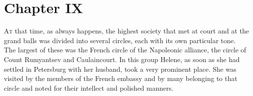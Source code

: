 
\chapter*{Chapter IX}
\ifaudio     
{} 
\fi

\lettrine[lines=2, loversize=0.3, lraise=0]{\initfamily A}{t}
that time, as always happens, the highest society that met at
court and at the grand balls was divided into several circles,
each with its own particular tone. The largest of these was the
French circle of the Napoleonic alliance, the circle of Count
Rumyantsev and Caulaincourt. In this group Helene, as soon as she
had settled in Petersburg with her husband, took a very prominent
place. She was visited by the members of the French embassy and
by many belonging to that circle and noted for their intellect
and polished manners.

